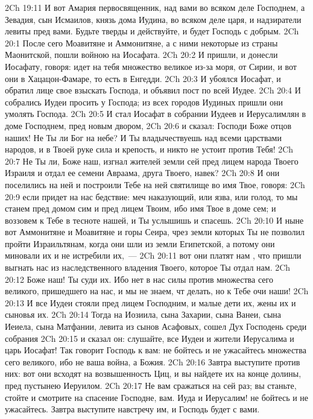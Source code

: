 \vs 2Ch 19:11 И вот Амария первосвященник, над вами во всяком деле Господнем, а Зевадия, сын Исмаилов, князь дома Иудина, во всяком деле царя, и надзиратели левиты пред вами. Будьте тверды и действуйте, и будет Господь с добрым.
\vs 2Ch 20:1 После сего Моавитяне и Аммонитяне, а с ними некоторые из страны Маонитской, пошли войною на Иосафата.
\vs 2Ch 20:2 И пришли, и донесли Иосафату, говоря: идет на тебя множество великое из-за моря, от Сирии, и вот они в Хацацон-Фамаре, то есть в Енгедди.
\vs 2Ch 20:3 И убоялся Иосафат, и обратил лице свое взыскать Господа, и объявил пост по всей Иудее.
\vs 2Ch 20:4 И собрались Иудеи просить  у Господа; из всех городов Иудиных пришли они умолять Господа.
\rsbpar\vs 2Ch 20:5 И стал Иосафат в собрании Иудеев и Иерусалимлян в доме Господнем, пред новым двором,
\vs 2Ch 20:6 и сказал: Господи Боже отцов наших! Не Ты ли Бог на небе? И Ты владычествуешь над всеми царствами народов, и в Твоей руке сила и крепость, и никто не устоит против Тебя!
\vs 2Ch 20:7 Не Ты ли, Боже наш, изгнал жителей земли сей пред лицем народа Твоего Израиля и отдал ее семени Авраама, друга Твоего, навек?
\vs 2Ch 20:8 И они поселились на ней и построили Тебе на ней святилище во имя Твое, говоря:
\vs 2Ch 20:9 если придет на нас бедствие: меч наказующий, или язва, или голод, то мы станем пред домом сим и пред лицем Твоим, ибо имя Твое в доме сем; и воззовем к Тебе в тесноте нашей, и Ты услышишь и спасешь.
\vs 2Ch 20:10 И ныне вот Аммонитяне и Моавитяне и  горы Сеира, чрез земли которых Ты не позволил пройти Израильтянам, когда они шли из земли Египетской, а потому они миновали их и не истребили их,~---
\vs 2Ch 20:11 вот они платят нам , что пришли выгнать нас из наследственного владения Твоего, которое Ты отдал нам.
\vs 2Ch 20:12 Боже наш! Ты суди их. Ибо нет в нас силы против множества сего великого, пришедшего на нас, и мы не знаем, чт делать, но к Тебе очи наши!
\vs 2Ch 20:13 И все Иудеи стояли пред лицем Господним, и малые дети их, жены их и сыновья их.
\rsbpar\vs 2Ch 20:14 Тогда на Иозиила, сына Захарии, сына Ванеи, сына Иеиела, сына Матфании, левита из сынов Асафовых, сошел Дух Господень среди собрания
\vs 2Ch 20:15 и сказал он: слушайте, все Иудеи и жители Иерусалима и царь Иосафат! Так говорит Господь к вам: не бойтесь и не ужасайтесь множества сего великого, ибо не ваша война, а Божия.
\vs 2Ch 20:16 Завтра выступите против них: вот они всходят на возвышенность Циц, и вы найдете их на конце долины, пред пустынею Иеруилом.
\vs 2Ch 20:17 Не вам сражаться на сей раз; вы станьте, стойте и смотрите на спасение Господне,  вам. Иуда и Иерусалим! не бойтесь и не ужасайтесь. Завтра выступите навстречу им, и Господь будет с вами.
